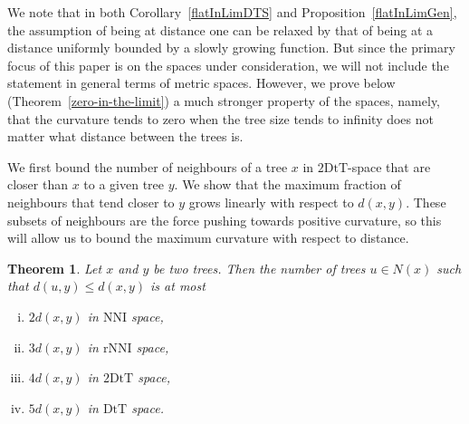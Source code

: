 \documentclass{amsart}
\newtheorem{theorem}[lemma]{Theorem}
\newcommand{\dts}{\mathrm{2DtT}}
\newcommand{\nni}{\mathrm{NNI}}
\newcommand{\rnni}{\mathrm{rNNI}}
\newcommand{\mdts}{\mathrm{DtT}}
\begin{document}
We note that in both Corollary~\ref{flatInLimDTS} and Proposition~\ref{flatInLimGen}, the assumption of being at distance one can be relaxed by that of being at a distance uniformly bounded by a slowly growing function.
But since the primary focus of this paper is on the spaces under consideration, we will not  include the statement in general terms of metric spaces.
However, we prove below (Theorem~\ref{zero-in-the-limit}) a much stronger property of the spaces, namely, that the curvature tends to zero when the tree size tends to infinity does not matter what distance between the trees is.

We first bound the number of neighbours of a tree $x$ in $\dts$-space that are closer than $x$ to a given tree $y$.
We show that the maximum fraction of neighbours that tend closer to $y$ grows linearly with respect to $d(x,y)$.
These subsets of neighbours are the force pushing towards positive curvature, so this will allow us to bound the maximum curvature with respect to distance.

\begin{theorem}
\label{max_good_neighbors}
Let $x$ and $y$ be two trees.
Then the number of trees $u \in N(x)$ such that $d(u, y) \le d(x, y)$ is at most 
\begin{enumerate}[(i)]
\item $2d(x,y)$ in $\nni$ space,
\item $3d(x,y)$ in $\rnni$ space,
\item $4d(x,y)$ in $\dts$ space,
\item $5d(x,y)$ in $\mdts$ space.
\end{enumerate}
\end{theorem}
\end{document}
